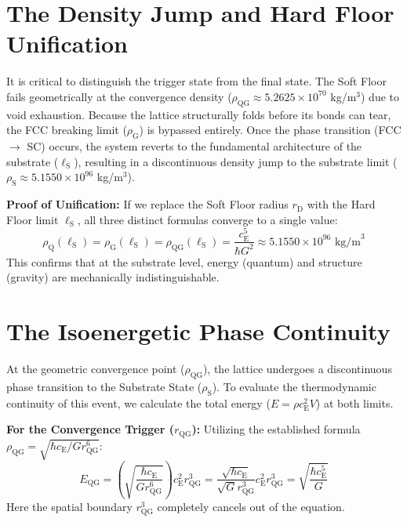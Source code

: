 \section{The Density Jump and Hard Floor Unification}
It is critical to distinguish the trigger state from the final state. The Soft Floor fails geometrically at the convergence density ($\rho_{\mathrm{QG}} \approx 5.2625 \times 10^{70}$ kg/m$^3$) due to void exhaustion. Because the lattice structurally folds before its bonds can tear, the FCC breaking limit ($\rho_{\mathrm{G}}$) is bypassed entirely. Once the phase transition (FCC $\to$ SC) occurs, the system reverts to the fundamental architecture of the substrate ($\ell_{\mathrm{S}}$), resulting in a discontinuous density jump to the substrate limit ($\rho_{\mathrm{S}} \approx 5.1550 \times 10^{96}$ kg/m$^3$).

\noindent\textbf{Proof of Unification:} If we replace the Soft Floor radius $r_{\mathrm{D}}$ with the Hard Floor limit $\ell_{\mathrm{S}}$, all three distinct formulas converge to a single value:
\begin{equation}
    \rho_{\mathrm{Q}}(\ell_{\mathrm{S}}) = \rho_{\mathrm{G}}(\ell_{\mathrm{S}}) = \rho_{\mathrm{QG}}(\ell_{\mathrm{S}}) = \frac{c_{\mathrm{E}}^5}{\hbar G^2} \approx 5.1550 \times 10^{96} \text{ kg/m}^3
\end{equation}
This confirms that at the substrate level, energy (quantum) and structure (gravity) are mechanically indistinguishable.

\section{The Isoenergetic Phase Continuity}
At the geometric convergence point ($\rho_{\mathrm{QG}}$), the lattice undergoes a discontinuous phase transition to the Substrate State ($\rho_{\mathrm{S}}$). To evaluate the thermodynamic continuity of this event, we calculate the total energy ($E = \rho c_{\mathrm{E}}^2 V$) at both limits. 

\noindent\textbf{For the Convergence Trigger ($r_{\mathrm{QG}}$):} Utilizing the established formula $\rho_{\mathrm{QG}} = \sqrt{\hbar c_{\mathrm{E}} / G r_{\mathrm{QG}}^6}$:
\begin{equation}
    E_{\mathrm{QG}} = \left(\sqrt{\frac{\hbar c_{\mathrm{E}}}{G r_{\mathrm{QG}}^6}}\right) c_{\mathrm{E}}^2 r_{\mathrm{QG}}^3 = \frac{\sqrt{\hbar c_{\mathrm{E}}}}{\sqrt{G} r_{\mathrm{QG}}^3} c_{\mathrm{E}}^2 r_{\mathrm{QG}}^3 = \sqrt{\frac{\hbar c_{\mathrm{E}}^5}{G}}
\end{equation}
Here the spatial boundary $r_{\mathrm{QG}}^3$ completely cancels out of the equation. 

